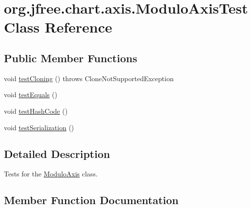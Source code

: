 \hypertarget{classorg_1_1jfree_1_1chart_1_1axis_1_1_modulo_axis_test}{}\section{org.\+jfree.\+chart.\+axis.\+Modulo\+Axis\+Test Class Reference}
\label{classorg_1_1jfree_1_1chart_1_1axis_1_1_modulo_axis_test}
\subsection*{Public Member Functions}
\begin{DoxyCompactItemize}
\item 
void \mbox{\hyperlink{classorg_1_1jfree_1_1chart_1_1axis_1_1_modulo_axis_test_a0f890ec2f40bc88c420213799af94414}{test\+Cloning}} ()  throws Clone\+Not\+Supported\+Exception 
\item 
void \mbox{\hyperlink{classorg_1_1jfree_1_1chart_1_1axis_1_1_modulo_axis_test_a493c37190ef735cd0f3750754ef6dae2}{test\+Equals}} ()
\item 
void \mbox{\hyperlink{classorg_1_1jfree_1_1chart_1_1axis_1_1_modulo_axis_test_a80da61a6f4e098e28ff06f14c044e9ee}{test\+Hash\+Code}} ()
\item 
void \mbox{\hyperlink{classorg_1_1jfree_1_1chart_1_1axis_1_1_modulo_axis_test_a9b00ded79f1007a30e429b7627ffd754}{test\+Serialization}} ()
\end{DoxyCompactItemize}


\subsection{Detailed Description}
Tests for the \mbox{\hyperlink{classorg_1_1jfree_1_1chart_1_1axis_1_1_modulo_axis}{Modulo\+Axis}} class. 

\subsection{Member Function Documentation}
\mbox{\label{classorg_1_1jfree_1_1chart_1_1axis_1_1_modulo_axis_test_a0f890ec2f40bc88c420213799af94414}} 
